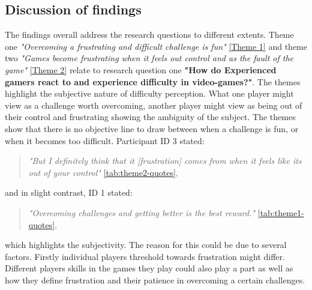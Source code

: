 \subsection{Discussion of findings}

The findings overall address the research questions to different extents. Theme one \textit{"Overcoming a frustrating and difficult challenge is fun"} \ref{Theme 1} and theme two \textit{"Games become frustrating when it feels out control and as the fault of the game"} \ref{Theme 2} relate to research question one \textbf{"How do Experienced gamers react to and experience difficulty in video-games?"}. The themes highlight the subjective nature of difficulty perception. What one player might view as a challenge worth overcoming, another player might view as being out of their control and frustrating showing the ambiguity of the subject. The themes show that there is no objective line to draw between when a challenge is fun, or when it becomes too difficult. Participant ID 3 stated: 
\begin{quote}
    \textit{"But I definitely think that it [frustration] comes from when it feels like its out of your control"} \ref{tab:theme2-quotes},
\end{quote}
and in slight contrast, ID 1 stated:
\begin{quote}
    \textit{"Overcoming challenges and getting better is the best reward."} \ref{tab:theme1-quotes},
\end{quote}
which highlights the subjectivity. The reason for this could be due to several factors. Firstly individual players threshold towards frustration might differ. Different players skills in the games they play could also play a part as well as how they define frustration and their patience in overcoming a certain challenges. 

